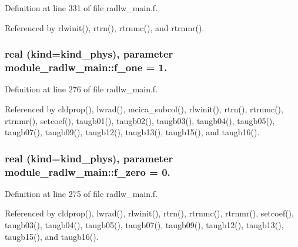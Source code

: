 Definition at line 331 of file radlw\+\_\+main.\+f.



Referenced by rlwinit(), rtrn(), rtrnmc(), and rtrnmr().

\subsubsection[{\texorpdfstring{f\+\_\+one}{f_one}}]{\setlength{\rightskip}{0pt plus 5cm}real (kind=kind\+\_\+phys), parameter module\+\_\+radlw\+\_\+main\+::f\+\_\+one = 1.\hspace{0.3cm}{\ttfamily [private]}}\hypertarget{namespacemodule__radlw__main_a518605a1451822f1888c6c7e85e07328}{}\label{namespacemodule__radlw__main_a518605a1451822f1888c6c7e85e07328}


Definition at line 276 of file radlw\+\_\+main.\+f.



Referenced by cldprop(), lwrad(), mcica\+\_\+subcol(), rlwinit(), rtrn(), rtrnmc(), rtrnmr(), setcoef(), taugb01(), taugb02(), taugb03(), taugb04(), taugb05(), taugb07(), taugb09(), taugb12(), taugb13(), taugb15(), and taugb16().

\subsubsection[{\texorpdfstring{f\+\_\+zero}{f_zero}}]{\setlength{\rightskip}{0pt plus 5cm}real (kind=kind\+\_\+phys), parameter module\+\_\+radlw\+\_\+main\+::f\+\_\+zero = 0.\hspace{0.3cm}{\ttfamily [private]}}\hypertarget{namespacemodule__radlw__main_a9b8f65236249b31c8f9fcf1cfd0e7baa}{}\label{namespacemodule__radlw__main_a9b8f65236249b31c8f9fcf1cfd0e7baa}


Definition at line 275 of file radlw\+\_\+main.\+f.



Referenced by cldprop(), lwrad(), rlwinit(), rtrn(), rtrnmc(), rtrnmr(), setcoef(), taugb03(), taugb04(), taugb05(), taugb07(), taugb09(), taugb12(), taugb13(), taugb15(), and taugb16().

